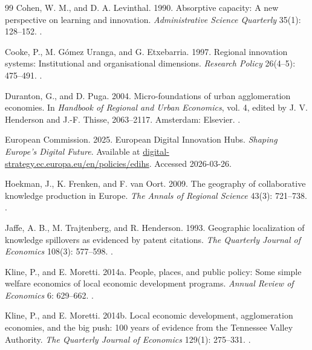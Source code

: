 \begin{thebibliography}{99}
Cohen, W. M., and D. A. Levinthal. 1990. Absorptive capacity: A new perspective on learning and innovation. \emph{Administrative Science Quarterly} 35(1): 128--152. .

Cooke, P., M. G{\'o}mez Uranga, and G. Etxebarria. 1997. Regional innovation systems: Institutional and organisational dimensions. \emph{Research Policy} 26(4--5): 475--491. .

Duranton, G., and D. Puga. 2004. Micro-foundations of urban agglomeration economies. In \emph{Handbook of Regional and Urban Economics}, vol. 4, edited by J. V. Henderson and J.-F. Thisse, 2063--2117. Amsterdam: Elsevier. .

European Commission. 2025. European Digital Innovation Hubs. \emph{Shaping Europe's Digital Future}. Available at \href{https://digital-strategy.ec.europa.eu/en/policies/edihs}{digital-strategy.ec.europa.eu/en/policies/edihs}. Accessed 2026-03-26.

Hoekman, J., K. Frenken, and F. van Oort. 2009. The geography of collaborative knowledge production in Europe. \emph{The Annals of Regional Science} 43(3): 721--738. .

Jaffe, A. B., M. Trajtenberg, and R. Henderson. 1993. Geographic localization of knowledge spillovers as evidenced by patent citations. \emph{The Quarterly Journal of Economics} 108(3): 577--598. .

Kline, P., and E. Moretti. 2014a. People, places, and public policy: Some simple welfare economics of local economic development programs. \emph{Annual Review of Economics} 6: 629--662. .

Kline, P., and E. Moretti. 2014b. Local economic development, agglomeration economies, and the big push: 100 years of evidence from the Tennessee Valley Authority. \emph{The Quarterly Journal of Economics} 129(1): 275--331. .


\end{thebibliography}
